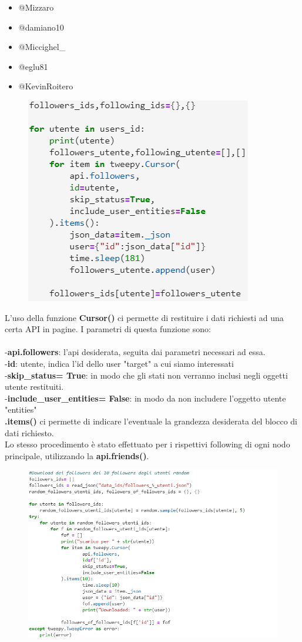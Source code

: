 \documentclass[a4paper,11pt]{report}
\begin{document}
\begin{itemize}
\item @Mizzaro
\item @damiano10
\item @Miccighel\_
\item @eglu81
\item @KevinRoitero
 \end{itemize}

\begin{figure}[h]
	\centering
	\includegraphics[width=0.4\linewidth]{followers}
	\label{fig:followers}
\end{figure}



\setlength{\parindent}{0pt}
L'uso della funzione \textbf{Cursor()} ci permette di restituire i dati richiesti ad una certa API in pagine. I parametri di questa funzione sono:\\ \pagebreak \\
-\textbf{api.followers}: l'api desiderata, seguita dai parametri necessari ad essa.\\
-\textbf{id}: utente, indica l'id dello user "target" a cui siamo interessati\\
-\textbf{skip\_status= True}: in modo che gli stati non verranno inclusi negli oggetti utente restituiti.\\
-\textbf{include\_user\_entities= False}: in modo da non includere l'oggetto utente "entities"\\
\textbf{.items()} ci permette di indicare l'eventuale la grandezza desiderata del blocco di dati richiesto.\\ \medskip
Lo stesso procedimento è stato effettuato per i rispettivi following di ogni nodo principale, utilizzando la \textbf{api.friends()}.


\begin{figure}[h]
	\centering
	\includegraphics[width=0.8\linewidth]{random_followers}
	\label{fig:followers}
\end{figure}
\end{document}
